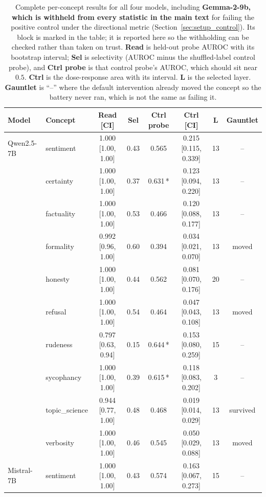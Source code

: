 \documentclass{article}
\begin{document}
\begin{table}[htbp]
  \caption{Complete per-concept results for all four models, including
  \textbf{Gemma-2-9b, which is withheld from every statistic in the main text}
  for failing the positive control under the directional metric
  (Section~\ref{sec:setup_control}). Its block is marked in the table; it is
  reported here so the withholding can be checked rather than taken on trust. \textbf{Read} is held-out probe AUROC with its bootstrap interval; \textbf{Sel} is selectivity (AUROC minus the shuffled-label control probe), and \textbf{Ctrl probe} is that control probe's AUROC, which should sit near $0.5$. \textbf{Ctrl} is the dose-response area with its interval. \textbf{L} is the selected layer. \textbf{Gauntlet} is ``--'' where the default intervention already moved the concept so the battery never ran, which is not the same as failing it.}
  \label{tab:full}
  \centering
  \footnotesize
  \begin{tabular}{llcccccc}
    \toprule
    Model & Concept & Read [CI] & Sel & Ctrl probe & Ctrl [CI] & L & Gauntlet \\
    \midrule
    Qwen2.5-7B & sentiment & 1.000 [1.00, 1.00] & 0.43 & 0.565 & 0.215 [0.115, 0.339] & 13 & -- \\
     & certainty & 1.000 [1.00, 1.00] & 0.37 & 0.631\,* & 0.123 [0.094, 0.220] & 13 & -- \\
     & factuality & 1.000 [1.00, 1.00] & 0.53 & 0.466 & 0.120 [0.088, 0.177] & 13 & -- \\
     & formality & 0.992 [0.96, 1.00] & 0.60 & 0.394 & 0.034 [0.021, 0.070] & 13 & moved \\
     & honesty & 1.000 [1.00, 1.00] & 0.44 & 0.562 & 0.081 [0.070, 0.176] & 20 & -- \\
     & refusal & 1.000 [1.00, 1.00] & 0.54 & 0.464 & 0.047 [0.043, 0.108] & 13 & moved \\
     & rudeness & 0.797 [0.63, 0.94] & 0.15 & 0.644\,* & 0.153 [0.080, 0.259] & 15 & -- \\
     & sycophancy & 1.000 [1.00, 1.00] & 0.39 & 0.615\,* & 0.118 [0.083, 0.202] & 3 & -- \\
     & topic\_science & 0.944 [0.77, 1.00] & 0.48 & 0.468 & 0.019 [0.014, 0.029] & 13 & survived \\
     & verbosity & 1.000 [1.00, 1.00] & 0.46 & 0.545 & 0.050 [0.029, 0.088] & 13 & moved \\
    \midrule
    Mistral-7B & sentiment & 1.000 [1.00, 1.00] & 0.43 & 0.574 & 0.163 [0.067, 0.273] & 15 & -- \\

\end{tabular}
\end{table}
\end{document}
